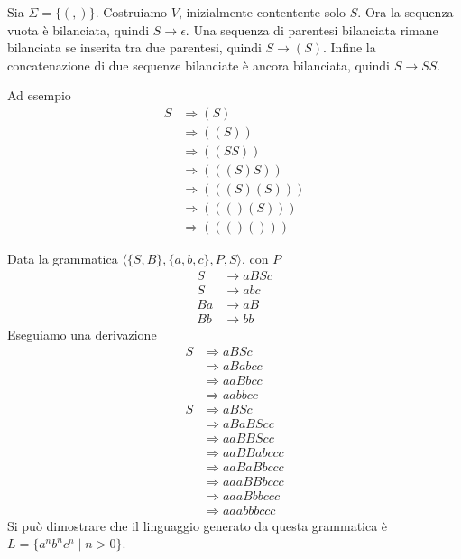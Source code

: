 \documentclass[12pt]{report}
\begin{document}
\begin{tcolorbox}%
	Sia $\Sigma = \{ (, ) \}$.
	Costruiamo $V$, inizialmente contentente solo $S$.
	Ora la sequenza vuota è bilanciata, quindi $S \rightarrow \epsilon$.
	Una sequenza di parentesi bilanciata rimane bilanciata se inserita tra due parentesi, quindi $S \rightarrow (S)$.
	Infine la concatenazione di due sequenze bilanciate è ancora bilanciata, quindi $S \rightarrow S S $.

	Ad esempio 
	\begin{align*}
		S &\Rightarrow ( S ) \\
		  &\Rightarrow ( ( S ) ) \\
		  &\Rightarrow ( ( S S ) ) \\
		  &\Rightarrow ( ( ( S ) S ) ) \\
		  &\Rightarrow ( ( ( S ) ( S ) ) ) \\
		  &\Rightarrow ( ( ( ) ( S ) ) ) \\
		  & \Rightarrow ( ( ( ) ( ) ) ) 
	\end{align*}
\end{tcolorbox}

\begin{tcolorbox}
	Data la grammatica $\langle \{S, B\}, \{a, b, c\}, P, S \rangle$, con $P$
	\begin{align*}
		S &\rightarrow a B S c \\
		S &\rightarrow a b c \\
		B a &\rightarrow a B \\
		B b &\rightarrow b b 
	\end{align*}
	Eseguiamo una derivazione
	\begin{align*}
		S &\Rightarrow a B S c \\
		  &\Rightarrow a B a b c c \\
		  &\Rightarrow a a B b c c \\
		  &\Rightarrow a a b b c c \\
		S &\Rightarrow a B S c \\
		  &\Rightarrow a B a B S c c \\
		  &\Rightarrow a a B B S c c \\
		  &\Rightarrow a a B B a b c c c \\
		  &\Rightarrow a a B a B b c c c \\
		  &\Rightarrow a a a B B b c c c \\
		  &\Rightarrow a a a B b b c c c \\
		  &\Rightarrow a a a b b b c c c
	\end{align*}
	Si può dimostrare che il linguaggio generato da questa grammatica è $L = \{a^nb^nc^n \mid n > 0 \}$.
\end{tcolorbox}
\end{document}
